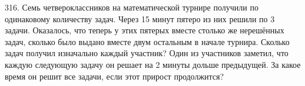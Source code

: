 316. Семь четвероклассников на математической турнире получили по одинаковому количеству задач. Через 15 минут пятеро из них решили по 3 задачи. Оказалось, что теперь у этих пятерых вместе столько же нерешённых задач, сколько было выдано вместе двум остальным в начале турнира. Сколько задач получил изначально каждый участник? Один из участников заметил, что каждую следующую задачу он решает на 2 минуты дольше предыдущей. За какое время он решит все задачи, если этот прирост продолжится?\\
